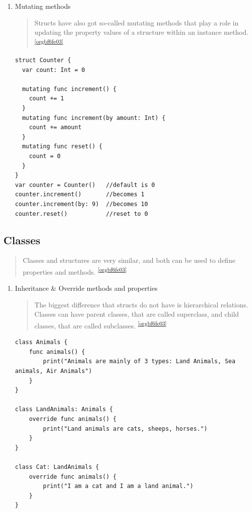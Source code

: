 \documentclass[a4paper,12pt]{article}
\begin{document}
\begin{enumerate}
\item Mutating methods
\label{sec:orgefed3e7}
\begin{verse}
Structs have also got so-called mutating methods that play a role in updating the property values of a structure within an instance method. \textsuperscript{\ref{orgbf6fe03}}\\
\end{verse}
\lstset{breaklines=true,language=swift,label= ,caption= ,captionpos=b,firstnumber=1,numbers=left}
\begin{lstlisting}
struct Counter {
  var count: Int = 0

  mutating func increment() {
    count += 1
  }
  mutating func increment(by amount: Int) {
    count += amount
  }
  mutating func reset() {
    count = 0
  }
}
var counter = Counter()   //default is 0
counter.increment()       //becomes 1
counter.increment(by: 9)  //becomes 10
counter.reset()           //reset to 0
\end{lstlisting}
\end{enumerate}

\subsection{Classes}
\label{sec:orgfff6d50}
\begin{verse}
Classes and structures are very similar, and both can be used to define properties and methods. \textsuperscript{\ref{orgbf6fe03}}\\
\end{verse}
\begin{enumerate}
\item Inheritance \& Override methods and properties
\label{sec:orgb60a314}
\begin{verse}
The biggest difference that structs do not have is hierarchical relations. Classes can have parent classes, that are called superclass, and child classes, that are called subclasses. \textsuperscript{\ref{orgbf6fe03}}\\
\end{verse}
\lstset{breaklines=true,language=swift,label= ,caption= ,captionpos=b,firstnumber=1,numbers=left}
\begin{lstlisting}
class Animals {
    func animals() {
        print("Animals are mainly of 3 types: Land Animals, Sea animals, Air Animals")
    }
}

class LandAnimals: Animals {
    override func animals() {
        print("Land animals are cats, sheeps, horses.")
    }
}

class Cat: LandAnimals {
    override func animals() {
        print("I am a cat and I am a land animal.")
    }
}
\end{lstlisting}
\end{enumerate}
\end{document}
